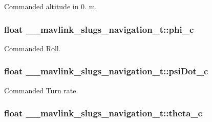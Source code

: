 Commanded altitude in 0. m. 

\hypertarget{struct____mavlink__slugs__navigation__t_a3660fd636496c1bda23212f10b2095c9}{
\subsubsection[{phi\+\_\+c}]{\setlength{\rightskip}{0pt plus 5cm}float \+\_\+\+\_\+mavlink\+\_\+slugs\+\_\+navigation\+\_\+t\+::phi\+\_\+c}}\label{struct____mavlink__slugs__navigation__t_a3660fd636496c1bda23212f10b2095c9}


Commanded Roll. 

\hypertarget{struct____mavlink__slugs__navigation__t_a2434700ae9d16a4e75617351023b53ba}{
\subsubsection[{psi\+Dot\+\_\+c}]{\setlength{\rightskip}{0pt plus 5cm}float \+\_\+\+\_\+mavlink\+\_\+slugs\+\_\+navigation\+\_\+t\+::psi\+Dot\+\_\+c}}\label{struct____mavlink__slugs__navigation__t_a2434700ae9d16a4e75617351023b53ba}


Commanded Turn rate. 

\hypertarget{struct____mavlink__slugs__navigation__t_a6c0f3c6f097472d50925ec77ab63e46b}{
\subsubsection[{theta\+\_\+c}]{\setlength{\rightskip}{0pt plus 5cm}float \+\_\+\+\_\+mavlink\+\_\+slugs\+\_\+navigation\+\_\+t\+::theta\+\_\+c}}\label{struct____mavlink__slugs__navigation__t_a6c0f3c6f097472d50925ec77ab63e46b}


